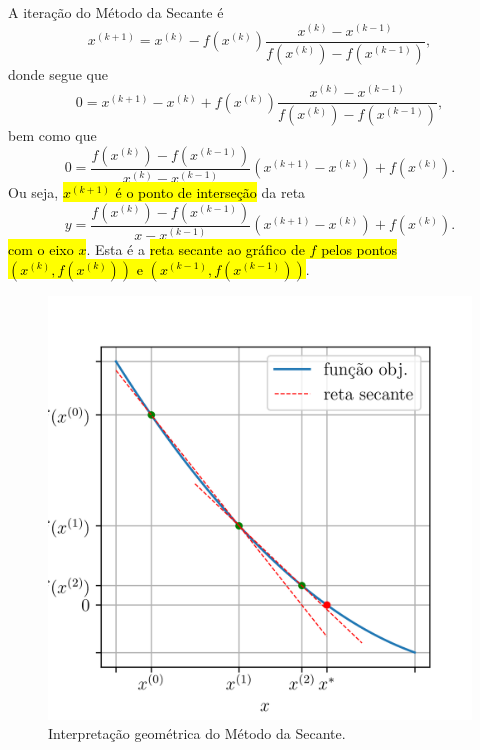 A iteração do Método da Secante é
\begin{equation}
  x^{(k+1)} = x^{(k)} - f(x^{(k)})\frac{x^{(k)}-x^{(k-1)}}{f(x^{(k)})-f(x^{(k-1)})},
\end{equation}
donde segue que
\begin{equation}
  0 = x^{(k+1)}-x^{(k)} + f(x^{(k)})\frac{x^{(k)}-x^{(k-1)}}{f(x^{(k)})-f(x^{(k-1)})},
\end{equation}
bem como que
\begin{equation}\label{cap_eq1d_sec_secante:eq:secante_geointerp}
  0 = \frac{f(x^{(k)})-f(x^{(k-1)})}{x^{(k)}-x^{(k-1)}}(x^{(k+1)}-x^{(k)}) + f(x^{(k)}).
\end{equation}
Ou seja, \hl{$x^{(k+1)}$ é o ponto de interseção} da reta
\begin{equation}
  y = \frac{f(x^{(k)})-f(x^{(k-1)})}{x-x^{(k-1)}}(x^{(k+1)}-x^{(k)}) + f(x^{(k)}).
\end{equation}
\hl{com o eixo $x$}. Esta é a \hl{reta secante ao gráfico de $f$ pelos pontos $(x^{(k)}, f(x^{(k)}))$ e $(x^{(k-1)}, f(x^{(k-1)}))$}.

\begin{figure}[H]
  \centering
  \includegraphics[width=\textwidth]{./cap_eq1d/dados/fig_secante_geointerp/fig}
  \caption{Interpretação geométrica do Método da Secante.}
  \label{cap_eq1d_sec_secante:fig:secante_geointerp}
\end{figure}


